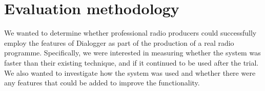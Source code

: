 






\section{Evaluation methodology}\label{sec:methods}

We wanted to determine whether professional radio producers could successfully employ the features of Dialogger
as part of the production of a real radio programme. Specifically, we were interested in measuring
whether the system was faster than their existing technique, and if it continued to be used after the trial.  We also
wanted to investigate how the system was used and whether there were any features that could be added to improve the
functionality.

